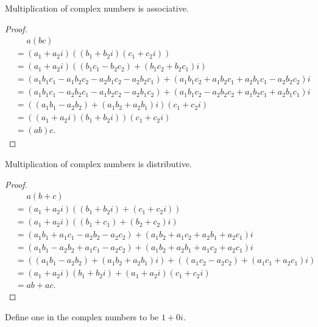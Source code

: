 \documentclass[../../math.tex]{subfiles}
\begin{document}
\begin{instance}
    Multiplication of complex numbers is associative.
\end{instance}
\begin{proof}
    \begin{align*}
        &\phantom{{}={}} a(bc) \\
        &= (a_1 + a_2i)((b_1 + b_2i)(c_1 + c_2i)) \\
        &= (a_1 + a_2i)((b_1 c_1 - b_2 c_2) + (b_1 c_2 + b_2 c_1)i) \\
        &= (a_1 b_1 c_1 - a_1 b_2 c_2 - a_2 b_1 c_2 - a_2 b_2 c_1) +
            (a_1 b_1 c_2 + a_1 b_2 c_1 + a_2 b_1 c_1 - a_2 b_2 c_2)i \\
        &= (a_1 b_1 c_1 - a_2 b_2 c_1 - a_1 b_2 c_2 - a_2 b_1 c_2) +
            (a_1 b_1 c_2 - a_2 b_2 c_2 + a_1 b_2 c_1 + a_2 b_1 c_1)i \\
        &= ((a_1 b_1 - a_2 b_2) + (a_1 b_2 + a_2 b_1)i)(c_1 + c_2i) \\
        &= ((a_1 + a_2i)(b_1 + b_2i))(c_1 + c_2i) \\
        &= (ab)c.
    \end{align*}
\end{proof}

\begin{instance}
    Multiplication of complex numbers is distributive.
\end{instance}
\begin{proof}
    \begin{align*}
    &\phantom{{}={}} a(b + c) \\
    &= (a_1 + a_2i)((b_1 + b_2i) + (c_1 + c_2i)) \\
    &= (a_1 + a_2i)((b_1 + c_1) + (b_2 + c_2)i) \\
    &= (a_1 b_1 + a_1 c_1 - a_2 b_2 - a_2 c_2) +
        (a_1 b_2 + a_1 c_2 + a_2 b_1 + a_2 c_1)i \\
    &= (a_1 b_1 - a_2 b_2 + a_1 c_1 - a_2 c_2) +
        (a_1 b_2 + a_2 b_1 + a_1 c_2 + a_2 c_1)i \\
    &= ((a_1 b_1 - a_2 b_2) + (a_1 b_2 + a_2 b_1)i) +
        ((a_1 c_2 - a_2 c_2) + (a_1 c_1 + a_2 c_1)i) \\
    &= (a_1 + a_2i)(b_1 + b_2i) + (a_1 + a_2i)(c_1 + c_2i) \\
    &= ab + ac.
    \end{align*}
\end{proof}

\begin{instance}
    Define one in the complex numbers to be $1 + 0i$.
\end{instance}
\end{document}
